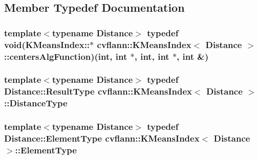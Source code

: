 \subsection{Member Typedef Documentation}
\hypertarget{classcvflann_1_1KMeansIndex_a09b9ff9e5a1686adc4a5e6cc8a765768}{
\subsubsection[{centers\-Alg\-Function}]{\setlength{\rightskip}{0pt plus 5cm}template$<$typename Distance$>$ typedef {\bf void}(K\-Means\-Index\-::$\ast$  {\bf cvflann\-::\-K\-Means\-Index}$<$ Distance $>$\-::centers\-Alg\-Function)(int, int $\ast$, int, int $\ast$, int \&)}}\label{classcvflann_1_1KMeansIndex_a09b9ff9e5a1686adc4a5e6cc8a765768}
\hypertarget{classcvflann_1_1KMeansIndex_adcf3e940c1ab76474f113c4db65d36c5}{
\subsubsection[{Distance\-Type}]{\setlength{\rightskip}{0pt plus 5cm}template$<$typename Distance$>$ typedef Distance\-::\-Result\-Type {\bf cvflann\-::\-K\-Means\-Index}$<$ Distance $>$\-::{\bf Distance\-Type}}}\label{classcvflann_1_1KMeansIndex_adcf3e940c1ab76474f113c4db65d36c5}
\hypertarget{classcvflann_1_1KMeansIndex_a2a28d6535e3e452320f97417f6c127ef}{
\subsubsection[{Element\-Type}]{\setlength{\rightskip}{0pt plus 5cm}template$<$typename Distance$>$ typedef Distance\-::\-Element\-Type {\bf cvflann\-::\-K\-Means\-Index}$<$ Distance $>$\-::{\bf Element\-Type}}}\label{classcvflann_1_1KMeansIndex_a2a28d6535e3e452320f97417f6c127ef}


